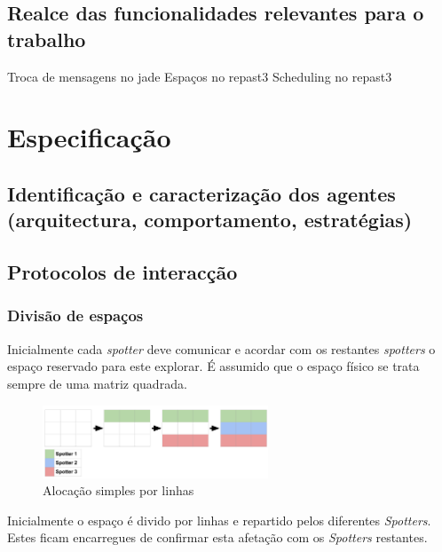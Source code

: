 \documentclass[12pt]{report}
\begin{document}
\section{Realce das funcionalidades relevantes para o trabalho}
Troca de mensagens no jade
Espaços no repast3
Scheduling no repast3


\chapter{Especificação}
\section{Identificação e caracterização dos agentes (arquitectura, comportamento, estratégias)}

\section{Protocolos de interacção}

\subsection{Divisão de espaços}
Inicialmente cada \textit{spotter} deve comunicar e acordar com os restantes \textit{spotters} o espaço reservado para este explorar.
É assumido que o espaço físico se trata sempre de uma matriz quadrada.

\begin{figure}[h]
  \centering
    \includegraphics[width=0.6\textwidth]{spotter-spaces}
  \caption{\small{Alocação simples por linhas}}
\end{figure}

Inicialmente o espaço é divido por linhas e repartido pelos diferentes \textit{Spotters}. Estes ficam encarregues de confirmar esta
afetação com os \textit{Spotters} restantes.
\end{document}
